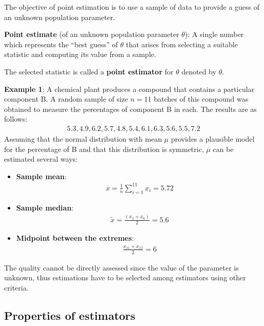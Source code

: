 \documentclass[10pt,a4paper]{article}
\begin{document}
The objective of point estimation is to use a sample of data to provide a guess of an unknown
population parameter. 

\begin{tcolorbox}[breakable,colback=white]
\textbf{Point estimate} (of an unknown population parameter $\theta$): A single number which
represents the “best guess” of $\theta$ that arises from selecting a suitable statistic and computing
its value from a sample.
\end{tcolorbox}

The selected statistic is called a \textbf{point estimator} for $\theta$ denoted by $\hat{\theta}$.

\textbf{Example 1}: A chemical plant produces a compound that contains a particular component B. A
random sample of size $n = 11$ batches of this compound was obtained to measure the percentages of component
B in each. The results are as follows:
\begin{align*}
    5.3, 4.9, 6.2, 5.7, 4.8, 5.4, 6.1, 6.3, 5.6, 5.5, 7.2
\end{align*}
Assuming that the normal distribution with mean $\mu$ provides a plausible model for the percentage
of B and that this distribution is symmetric, $\mu$ can be estimated several ways:
\begin{itemize}
    \item \textbf{Sample mean}: 
    \begin{align*}
        \overline{x} = \frac{1}{n} \sum_{i=1}^{11} x_i = 5.72
    \end{align*}
    \item \textbf{Sample median}:
    \begin{align*}
        \tilde{x} = \frac{(x_5+x_6)}{2} = 5.6
    \end{align*}
    \item \textbf{Midpoint between the extremes}:
    \begin{align*}
        \frac{x_11 + x_12}{2} = 6
    \end{align*}
\end{itemize}
The quality cannot be directly assessed since the value of the parameter is unknown, thus
estimations have to be selected among estimators using other criteria.

\subsection{Properties of estimators}
\end{document}
